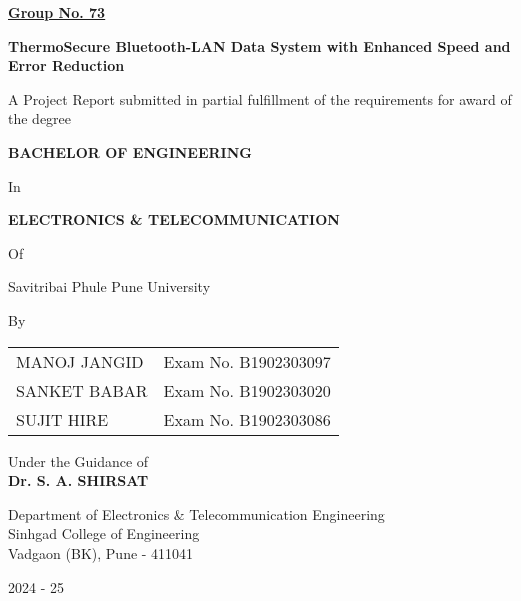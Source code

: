\documentclass[12pt]{report}
\newcommand{\projecttitle}{ThermoSecure Bluetooth-LAN Data System with Enhanced Speed and Error Reduction}
\newcommand{\university}{Savitribai Phule Pune University}
\newcommand{\college}{Sinhgad College of Engineering}
\newcommand{\department}{Department of Electronics \& Telecommunication Engineering}
\newcommand{\location}{Vadgaon (BK), Pune - 411041}
\begin{document}
\begin{titlepage}
    \centering
    \vspace*{1cm}
    
    \underline{\textbf{Group No. 73}}\\
    \vspace{0.5cm}
    
    \textbf{\Large \projecttitle}\\
    \vspace{1.5cm}
    
    A Project Report submitted in partial fulfillment of the requirements for award of the degree\\
    \vspace{0.5cm}
    
    \textbf{BACHELOR OF ENGINEERING}\\
    \vspace{0.5cm}
    
    In\\
    \vspace{0.5cm}
    
    \textbf{ELECTRONICS \& TELECOMMUNICATION}\\
    \vspace{0.5cm}
    
    Of\\
    \vspace{0.5cm}
    
    \university\\
    \vspace{1.5cm}
    
    By\\
    \vspace{0.5cm}
    \begin{tabular}{@{}l l@{}}
        MANOJ JANGID & Exam No. B1902303097 \\
        SANKET BABAR & Exam No. B1902303020 \\
        SUJIT HIRE & Exam No. B1902303086 \\
    \end{tabular}
    \vspace{1.5cm}
    
    Under the Guidance of\\
    \vspace{0.5cm}
    \textbf{Dr. S. A. SHIRSAT}\\
    \vspace{1cm}
    
    \department\\
    \college\\
    \location\\
    \vspace{0.5cm}
    
    2024 - 25
\end{titlepage}
\end{document}
